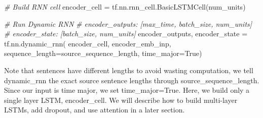 \documentclass[11pt]{article}
\newenvironment{Shaded}{}{}
\newcommand{\CommentTok}[1]{\textcolor[rgb]{0.38,0.63,0.69}{\textit{{#1}}}}
\newcommand{\NormalTok}[1]{{#1}}
\newcommand{\VariableTok}[1]{\textcolor[rgb]{0.10,0.09,0.49}{{#1}}}
\newcommand{\OperatorTok}[1]{\textcolor[rgb]{0.40,0.40,0.40}{{#1}}}
\begin{document}
\begin{Shaded}
\begin{Highlighting}[]
\CommentTok{# Build RNN cell}
\NormalTok{encoder_cell }\OperatorTok{=}\NormalTok{ tf.nn.rnn_cell.BasicLSTMCell(num_units)}

\CommentTok{# Run Dynamic RNN}
\CommentTok{#   encoder_outputs: [max_time, batch_size, num_units]}
\CommentTok{#   encoder_state: [batch_size, num_units]}
\NormalTok{encoder_outputs, encoder_state }\OperatorTok{=}\NormalTok{ tf.nn.dynamic_rnn(}
\NormalTok{    encoder_cell, encoder_emb_inp,}
\NormalTok{    sequence_length}\OperatorTok{=}\NormalTok{source_sequence_length, time_major}\OperatorTok{=}\VariableTok{True}\NormalTok{)}
\end{Highlighting}
\end{Shaded}

Note that sentences have different lengths to avoid wasting computation,
we tell dynamic\_rnn the exact source sentence lengths through
source\_sequence\_length. Since our input is time major, we set
time\_major=True. Here, we build only a single layer LSTM,
encoder\_cell. We will describe how to build multi-layer LSTMs, add
dropout, and use attention in a later section.
\end{document}
